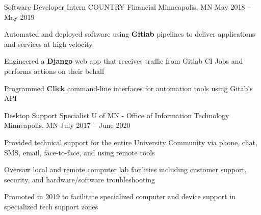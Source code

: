 \documentclass[]{awesome-cv}
\begin{document}
\begin{cventries}
	\cventry
	{Software Developer Intern}
	{COUNTRY Financial}
	{Minneapolis, MN}
	{May 2018 – May 2019}
	{\begin{cvitems}
		\item {Automated and deployed software using \textbf{Gitlab} pipelines to deliver applications and services at high velocity}
		\item {Engineered a \textbf{Django} web app that receives traffic from Gitlab CI Jobs and performs actions on their behalf}
		\item{Programmed \textbf{Click} command-line interfaces for automation tools using Gitab’s API}
		\end{cvitems}}
	\cventry
	{Desktop Support Specialist}
	{U of MN - Office of Information Technology}
	{Minneapolis, MN}
	{July 2017 – June 2020}
	{\begin{cvitems}
		\item {Provided technical support for the entire University Community via phone, chat, SMS, email, face-to-­face, and using remote tools}
		\item {Oversaw local and remote computer lab facilities including customer support, security, and hardware/software troubleshooting}
		\item{Promoted in 2019 to facilitate specialized computer and device support in specialized tech support zones}
		\end{cvitems}}
\end{cventries}


\end{document}
